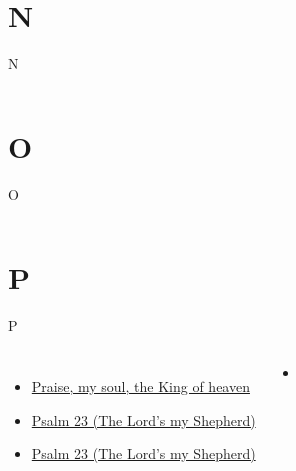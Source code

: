 \documentclass{beamer}
\begin{document}
\section{N}

\begin{frame}{N}
\begin{columns}

    


    


\end{columns}

\end{frame}

\section{O}

\begin{frame}{O}
\begin{columns}

    


    


\end{columns}

\end{frame}

\section{P}

\begin{frame}{P}
\begin{columns}
        \begin{itemize}
    \item \hyperlink{Praise, my soul, the King of heaven[]}{Praise, my soul, the King of heaven } \phantom{}
    \item \hyperlink{The Lord's my Shepherd['Psalm 23'](Townend)}{Psalm 23 (The Lord's my Shepherd)} \phantom{ 1}
    \item \hyperlink{The Lord's my Shepherd['Psalm 23'](Trad)}{Psalm 23 (The Lord's my Shepherd)} \phantom{ 1}
\end{itemize}
        \begin{itemize}
            \item[] \phantom{1}\end{itemize}


\end{columns}

\end{frame}
\end{document}
